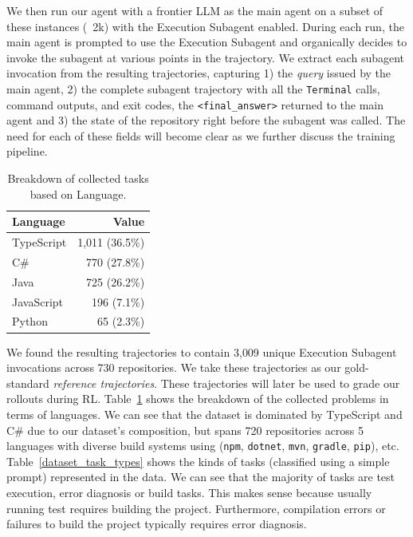 \documentclass[sigconf,review]{acmart}
\begin{document}
We then run our agent with a frontier LLM as the main agent on a subset of these instances (~2k) with the Execution Subagent enabled. During each run, the main agent is prompted to use the Execution Subagent and organically decides to invoke the subagent at various points in the trajectory. We extract each subagent invocation from the resulting trajectories, capturing 1) the \textit{query} issued by the main agent, 2) the complete subagent trajectory with all the \texttt{Terminal} calls, command outputs, and exit codes, the \texttt{<final\_answer>} returned to the main agent and 3) the state of the repository right before the subagent was called. The need for each of these fields will become clear as we further discuss the training pipeline.

\begin{table}[t]
\centering
\caption{Breakdown of collected tasks based on Language.}
\label{dataset_languages}
\small
\begin{tabular}{lr}
\toprule
\textbf{Language} & \textbf{Value} \\
\midrule
TypeScript & 1{,}011 (36.5\%) \\
C\# & 770 (27.8\%) \\
Java & 725 (26.2\%) \\
JavaScript & 196 (7.1\%) \\
Python & 65 (2.3\%) \\
\midrule
\end{tabular}
\end{table}

We found the resulting trajectories to contain 3{,}009 unique Execution Subagent invocations across 730 repositories. We take these trajectories as our gold-standard \textit{reference trajectories}. These trajectories will later be used to grade our rollouts during RL. Table~\ref{dataset_languages} shows the breakdown of the collected problems in terms of languages. We can see that the dataset is dominated by TypeScript and C\# due to our dataset's composition, but spans 720 repositories across 5 languages with diverse build systems using (\texttt{npm}, \texttt{dotnet}, \texttt{mvn}, \texttt{gradle}, \texttt{pip}), etc. Table~\ref{dataset_task_types} shows the kinds of tasks (classified using a simple prompt) represented in the data. We can see that the majority of tasks are test execution, error diagnosis or build tasks. This makes sense because usually running test requires building the project. Furthermore, compilation errors or failures to build the project typically requires error diagnosis.
\end{document}
